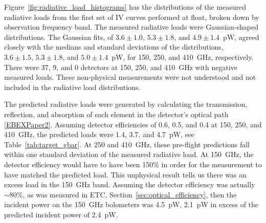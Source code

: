 




Figure~\ref{fig:radiative_load_histograms} has the distributions of the measured radiative loads from the first set of IV curves performed at float, broken down by observation frequency band. 
The measured radiative loads were Gaussian-shaped distributions. 
The Gaussian fits, of $3.6\pm 1.0, \, 5.3\pm 1.8$, and $4.9 \pm 1.4$~pW, agreed closely with the  medians and standard deviations of the distributions, $3.6\pm1.5, \, 5.3\pm1.8$, and $5.0\pm1.4$~pW, 
for 150, 250, and 410~GHz, respectively. 
There were 37, 9, and 0 detectors at 150, 250, and 410~GHz with negative measured loads. 
These non-physical measurements were not understood and not included in the radiative load distributions. 

The predicted radiative loads were generated by calculating the transmission, reflection, and absorption of each element in the detector's optical path \ref{EBEXPaper2}.  
Assuming detector efficiencies of 0.6, 0.5, and 0.4 at 150, 250, and 410~GHz, the predicted loads were 1.4, 3.7, and 4.7~pW, see Table~\ref{tab:target_gbar}.
At 250 and 410~GHz, these pre-flight predictions fall within one standard deviation of the measured radiative load. 
At 150~GHz, the detector efficiency would have to have been 150\% in order for the measurement to have matched the predicted load. 
This unphysical result tells us there was an excess load in the 150~GHz band. 
Assuming the detector efficiency was actually $\sim$80\%, as was measured in \ac{ETC}, Section~\ref{sec:optical_efficiency}, then the incident power on the 150~GHz bolometers was 4.5~pW, 2.1~pW in excess of the predicted incident power of 2.4~pW. 

